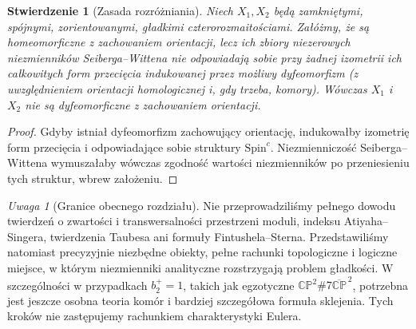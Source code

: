 \documentclass[11pt,a4paper]{report}
\numberwithin{equation}{section}
\theoremstyle{plain}
\newtheorem{stwierdzenie}[twierdzenie]{Stwierdzenie}
\theoremstyle{definition}
\theoremstyle{remark}
\newtheorem{uwaga}[twierdzenie]{Uwaga}
\begin{document}
\begin{stwierdzenie}[Zasada rozróżniania]
Niech $X_1,X_2$ będą zamkniętymi, spójnymi,
zorientowanymi, gładkimi czterorozmaitościami.
Załóżmy, że są homeomorficzne z zachowaniem orientacji,
lecz ich zbiory niezerowych niezmienników
Seiberga--Wittena nie odpowiadają sobie przy żadnej
izometrii ich całkowitych form przecięcia indukowanej
przez możliwy dyfeomorfizm (z uwzględnieniem orientacji
homologicznej i, gdy trzeba, komory). Wówczas $X_1$
i $X_2$ nie są dyfeomorficzne z zachowaniem orientacji.
\end{stwierdzenie}

\begin{proof}
Gdyby istniał dyfeomorfizm zachowujący orientację,
indukowałby izometrię form przecięcia i odpowiadające
sobie struktury $\mathrm{Spin}^c$. Niezmienniczość
Seiberga--Wittena wymuszałaby wówczas zgodność
wartości niezmienników po przeniesieniu tych struktur,
wbrew założeniu.
\end{proof}

\begin{center}
\end{center}

\begin{uwaga}[Granice obecnego rozdziału]
Nie przeprowadziliśmy pełnego dowodu twierdzeń o zwartości
i transwersalności przestrzeni moduli, indeksu Atiyaha--Singera,
twierdzenia Taubesa ani formuły Fintushela--Sterna.
Przedstawiliśmy natomiast precyzyjnie niezbędne obiekty,
pełne rachunki topologiczne i logiczne miejsce, w którym
niezmienniki analityczne rozstrzygają problem gładkości.
W szczególności w przypadkach $b_2^+=1$, takich jak egzotyczne
$\mathbb{CP}^2\#7\overline{\mathbb{CP}}^{\,2}$, potrzebna
jest jeszcze osobna teoria komór i bardziej szczegółowa
formuła sklejenia. Tych kroków nie zastępujemy
rachunkiem charakterystyki Eulera.
\end{uwaga}
\end{document}
